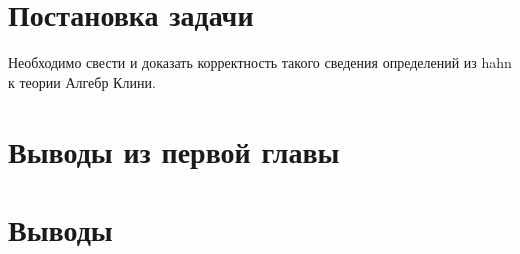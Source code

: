 \documentclass[times
              ]{itmo-student-thesis}
\begin{document}


  \section{Постановка задачи}
    Необходимо свести и доказать корректность такого сведения определений из hahn к теории Алгебр Клини.

  \section{Выводы из первой главы}

  \section{Выводы}





\end{document}
